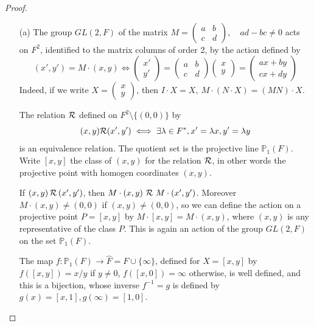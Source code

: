 \documentclass[11pt,a4paper]{article}
\begin{document}
\begin{proof}
\begin{enumerate}
\item[(a)]
The group $GL(2,F)$ of the matrix 
$M =
\left(
\begin{array}{cc}
 a&   b   \\
 c&   d   
\end{array}
\right), \quad ad-bc\neq 0
$
acts on $F^2$, identified to the matrix columns of order 2, by the action defined by 
$$(x',y') = M \cdot (x,y) \iff
 \left(
\begin{array}{c}
x'   \\
y'  
\end{array}
\right)
=
\left(
\begin{array}{cc}
 a&   b  \\
 c&   d   
\end{array}
\right)
\left(
\begin{array}{c}
x   \\
y   
\end{array}
\right)
=\left(
\begin{array}{c}
ax +by  \\
cx+dy  
\end{array}
\right) 
$$
Indeed, if we write 
$X=
\left(
\begin{array}{c}
x   \\
y   
\end{array}
\right)
$, then $I\cdot X=X,\  M\cdot (N\cdot X) = (MN)\cdot X$.

The relation $\cal{R}$ defined on $F^2 \setminus \{(0,0)\}$ by $$
(x,y)
{\cal R}
(x',y')
 \iff \exists \lambda \in F^*, x'=\lambda x,y'=\lambda y
 $$ 
 is an equivalence relation. The quotient set is the projective line $\mathbb{P}_1(F)$. Write $[x,y]$ the class of $(x,y)$ for the relation $\cal R$,  in other words the projective point with homogen coordinates $(x,y)$.

If $(x,y)\,  {\cal R}\,  (x',y')$, then $M\cdot (x,y)\ {\cal R}\  M\cdot (x',y')$. Moreover  $M\cdot (x,y) \neq (0,0)$ if $(x,y)\neq (0,0)$, so we can define the action on a projective point $P=[x,y]$ by $M\cdot [x,y] = M \cdot(x,y)$, where $(x,y)$ is any representative of the class $P$. This is again an action of the group $GL(2,F)$ on the set $\mathbb{P}_1(F)$.

The map $f : \mathbb{P}_1(F) \to \hat{F} = F \cup \{\infty\}$, defined for $X =  [x,y] $ by $f([x,y]) = x/y$ if $y\neq 0$, $f([x,0])=\infty$ otherwise, is well defined, and this is a bijection, whose inverse $f^{-1}=g$ is defined by $g(x) =[x,1],
g(\infty) = [1,0]
$.


\end{enumerate}
\end{proof}
\end{document}
